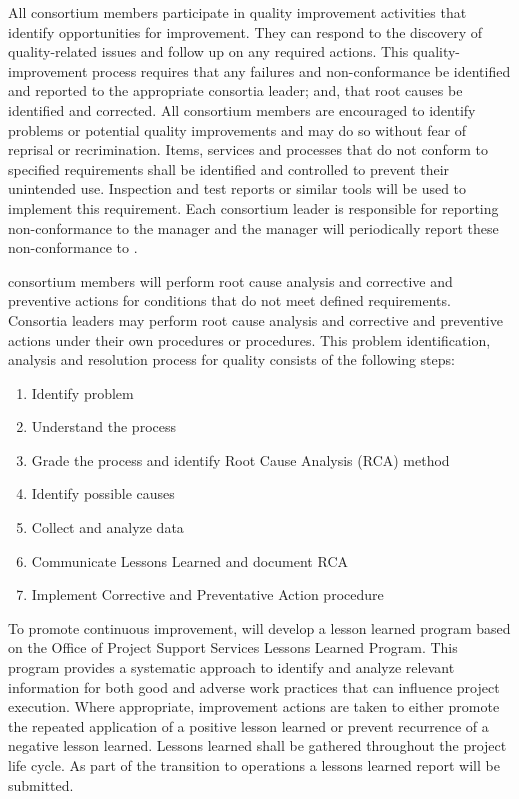 All  consortium members participate in quality improvement
activities that identify opportunities for improvement. They can
respond to the discovery of quality-related issues and follow up on
any required actions. This quality-improvement process requires that
any failures and non-conformance be identified and reported to the
appropriate consortia leader; and, that root causes be identified and
corrected. All consortium members are encouraged to identify problems
or potential quality improvements and may do so without fear of
reprisal or recrimination. Items, services and processes that do not
conform to specified requirements shall be identified and controlled
to prevent their unintended use. Inspection and test reports or
similar tools will be used to implement this requirement. Each
consortium leader is responsible for reporting non-conformance to the
  manager and the 
 manager will periodically report these non-conformance to
 .

 consortium members will perform root cause analysis and
corrective and preventive actions for conditions that do not meet
defined requirements. Consortia leaders may perform root cause
analysis and corrective and preventive actions under their own
procedures or \fnal procedures.  This problem identification, analysis
and resolution process for quality consists of the following steps:
\begin{enumerate}
  \item Identify problem
  \item Understand the process
  \item Grade the process and identify Root Cause Analysis (RCA)
    method
  \item Identify possible causes
  \item Collect and analyze data
  \item Communicate Lessons Learned and document RCA
  \item Implement Corrective and Preventative Action procedure
\end{enumerate}


To promote continuous improvement,   will develop a
lesson learned program based on the \fnal Office of Project Support
Services Lessons Learned Program. This program provides a systematic
approach to identify and analyze relevant information for both good
and adverse work practices that can influence project execution. Where
appropriate, improvement actions are taken to either promote the
repeated application of a positive lesson learned or prevent
recurrence of a negative lesson learned. Lessons learned shall be
gathered throughout the project life cycle. As part of the transition
to operations a lessons learned report will be submitted.

